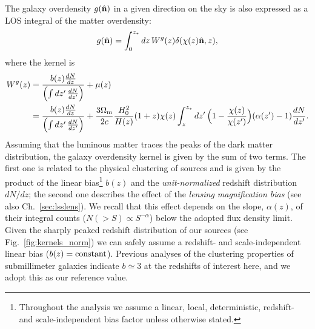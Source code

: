 The galaxy overdensity $g(\hat{\mathbf{n}})$ in a given direction on the sky is also expressed as a \gls{LOS} integral of the matter overdensity:
\begin{equation}
g(\hat{\mathbf{n}}) = \int_0^{z_*} dz\, W^{g}(z)\delta(\chi(z)\hat{\mathbf{n}},z),
\end{equation}
where the kernel is
\begin{equation}
\label{eqn:wgxc1}
\begin{split}
W^{g}(z) &= \frac{b(z)\frac{dN}{dz}}{\Bigl(\int dz'\,\frac{dN}{dz'}\Bigr)} + \mu(z)\\
&= \frac{b(z)\frac{dN}{dz}}{\Bigl(\int dz'\,\frac{dN}{dz'}\Bigr)} + \frac{3\Omega_{\rm m}}{2c}\frac{H_0^2}{H(z)}(1+z)\chi(z) \int_z^{z_*}dz'\,\Bigl(1-\frac{\chi(z)}{\chi(z')}\Bigr)(\alpha(z')-1)\frac{dN}{dz'}.
\end{split}
\end{equation}
%
Assuming that the luminous matter traces the peaks of the dark matter distribution, the galaxy overdensity kernel is given by the sum of two terms. The first one is related to the physical clustering of sources and is given by the product of the linear bias\footnote{Throughout the analysis we assume a linear, local, deterministic, redshift- and scale-independent bias factor unless otherwise stated.} $b(z)$ and the \emph{unit-normalized} redshift distribution $dN/dz$;  the second one describes the effect of the \emph{lensing magnification bias} \citep{Ho2008,Xia2009} (see also Ch.~\eqref{sec:lsslens}). We recall that this effect depends on the slope, $\alpha(z)$, of their integral counts ($N(>S) \propto S^{-\alpha}$) below the adopted flux density limit. Given the sharply peaked redshift distribution of our sources (see Fig.~\eqref{fig:kernels_norm}) we can safely assume a redshift- and scale-independent linear bias ($b(z)=\hbox{constant}$). Previous analyses of the clustering properties of submillimeter galaxies \cite{Xia2012,Cai2013} indicate $b\simeq 3$ at the redshifts of interest here, and we adopt this as our reference value.

